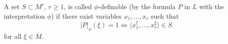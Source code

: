 A set $S \subset M^r$, $r \geqslant 1$, is called $\phi$-definable (by the formula $P$ in $L$ with the interpretation $\phi$) if there exist variables $x_1, \ldots, x_r$ such that
$$|P|_\phi(\xi) = 1 \iff \langle x_1^\xi, \ldots, x_r^\xi \rangle \in S$$
for all $\xi \in \overline{M}$.
